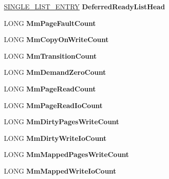 \begin{DoxyCompactItemize}
\item 
\mbox{\label{struct___k_p_r_c_b_af8f0cd565281ca14e724ddc45c5df4e1}} 
\hyperlink{struct___s_i_n_g_l_e___l_i_s_t___e_n_t_r_y}{S\+I\+N\+G\+L\+E\+\_\+\+L\+I\+S\+T\+\_\+\+E\+N\+T\+RY} {\bfseries Deferred\+Ready\+List\+Head}
\item 
\mbox{\label{struct___k_p_r_c_b_ab36b499a2bab4bd33e49b0ac47276195}} 
L\+O\+NG {\bfseries Mm\+Page\+Fault\+Count}
\item 
\mbox{\label{struct___k_p_r_c_b_a69637263bb9fa699158f64a5dfa6ed63}} 
L\+O\+NG {\bfseries Mm\+Copy\+On\+Write\+Count}
\item 
\mbox{\label{struct___k_p_r_c_b_a5fdbb6ea5b41eb2ead6b5bbd1b1f085f}} 
L\+O\+NG {\bfseries Mm\+Transition\+Count}
\item 
\mbox{\label{struct___k_p_r_c_b_a26ea75d6d58a252a3f0aa1f89d7ef7f3}} 
L\+O\+NG {\bfseries Mm\+Demand\+Zero\+Count}
\item 
\mbox{\label{struct___k_p_r_c_b_ac39b8d7e6f404a036af59cbcc2fcbf47}} 
L\+O\+NG {\bfseries Mm\+Page\+Read\+Count}
\item 
\mbox{\label{struct___k_p_r_c_b_a275cd5d1f792d15de256f8bc77b829ba}} 
L\+O\+NG {\bfseries Mm\+Page\+Read\+Io\+Count}
\item 
\mbox{\label{struct___k_p_r_c_b_a9c25c957f29ab85e614ac0a4d516f01b}} 
L\+O\+NG {\bfseries Mm\+Dirty\+Pages\+Write\+Count}
\item 
\mbox{\label{struct___k_p_r_c_b_ab8edd766e9b224f2d16f9662d1d30721}} 
L\+O\+NG {\bfseries Mm\+Dirty\+Write\+Io\+Count}
\item 
\mbox{\label{struct___k_p_r_c_b_ab23b5d1d9ef3e85aee0013bde45a82d1}} 
L\+O\+NG {\bfseries Mm\+Mapped\+Pages\+Write\+Count}
\item 
\mbox{\label{struct___k_p_r_c_b_a51e27b050e40819f74acb8472db6f518}} 
L\+O\+NG {\bfseries Mm\+Mapped\+Write\+Io\+Count}

\end{DoxyCompactItemize}
